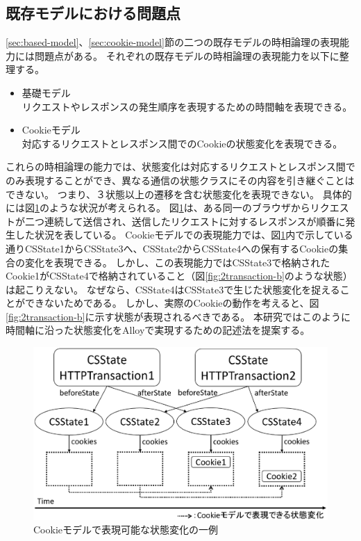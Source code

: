 \documentclass[journal]{IEEEtran}
\begin{document}
\subsection{既存モデルにおける問題点}
\label{sec:existing-models-problems}
\ref{sec:based-model}、\ref{sec:cookie-model}節の二つの既存モデルの時相論理の表現能力には問題点がある。
それぞれの既存モデルの時相論理の表現能力を以下に整理する。
\begin{itemize}
\item 基礎モデル \\
リクエストやレスポンスの発生順序を表現するための時間軸を表現できる。
\item Cookieモデル \\
対応するリクエストとレスポンス間でのCookieの状態変化を表現できる。
\end{itemize}
これらの時相論理の能力では、状態変化は対応するリクエストとレスポンス間でのみ表現することができ、異なる通信の状態クラスにその内容を引き継ぐことはできない。
つまり、３状態以上の遷移を含む状態変化を表現できない。
具体的には図\ref{fig:2transaction-a}のような状況が考えられる。
図\ref{fig:2transaction-a}は、ある同一のブラウザからリクエストが二つ連続して送信され、送信したリクエストに対するレスポンスが順番に発生した状況を表している。
Cookieモデルでの表現能力では、図\ref{fig:2transaction-a}内で示している通りCSState1からCSState3へ、CSState2からCSState4への保有するCookieの集合の変化を表現できる。
しかし、この表現能力ではCSState3で格納されたCookie1がCSState4で格納されていること（図\ref{fig:2transaction-b}のような状態）は起こりえない。
なぜなら、CSState4はCSState3で生じた状態変化を捉えることができないためである。
しかし、実際のCookieの動作を考えると、図\ref{fig:2transaction-b}に示す状態が表現されるべきである。
本研究ではこのように時間軸に沿った状態変化をAlloyで実現するための記述法を提案する。

\begin{figure}[htb]
\centering
\includegraphics[width=\hsize]{./fig/2transaction-a.eps}
\caption{Cookieモデルで表現可能な状態変化の一例}
\label{fig:2transaction-a}
\end{figure}
\end{document}
